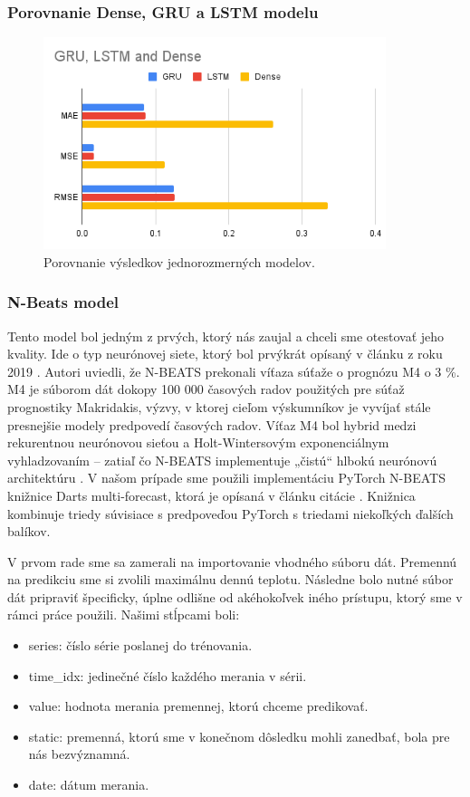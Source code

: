 \subsubsection{Porovnanie Dense, GRU a LSTM modelu}
\begin{figure}[!htbp]
  \centering
  \includegraphics[width=10cm]{img/GRU, LSTM and Dense.png}
  \caption{Porovnanie výsledkov jednorozmerných modelov.}
  \label{univariate}
\end{figure}

\subsubsection{N-Beats model} 
Tento model bol jedným z prvých, ktorý nás zaujal a chceli sme otestovať jeho kvality. Ide o typ neurónovej siete, ktorý bol prvýkrát opísaný v článku z roku 2019 \cite{n-beats}. Autori uviedli, že N-BEATS prekonali víťaza súťaže o prognózu M4 o 3 \%. M4 je súborom dát dokopy 100 000 časových radov použitých pre súťaž prognostiky Makridakis, výzvy, v ktorej cieľom výskumníkov je vyvíjať stále presnejšie modely predpovedí časových radov. Víťaz M4 bol hybrid medzi rekurentnou neurónovou sieťou a Holt-Wintersovým exponenciálnym vyhladzovaním – zatiaľ čo N-BEATS implementuje „čistú“ hlbokú neurónovú architektúru \cite{m4}. V našom prípade sme použili implementáciu PyTorch N-BEATS knižnice Darts multi-forecast, ktorá je opísaná v článku citácie \cite{beat-impl}. Knižnica kombinuje triedy súvisiace s predpoveďou PyTorch s triedami niekoľkých ďalších balíkov. 

V prvom rade sme sa zamerali na importovanie vhodného súboru dát. Premennú na predikciu sme si zvolili maximálnu dennú teplotu. Následne bolo nutné súbor dát pripraviť špecificky, úplne odlišne od akéhokoľvek iného prístupu, ktorý sme v rámci práce použili. Našimi stĺpcami boli:
\begin{itemize}
    \item series: číslo série poslanej do trénovania.
    \item time\_idx: jedinečné číslo každého merania v sérii.
    \item value: hodnota merania premennej, ktorú chceme predikovať.
    \item static: premenná, ktorú sme v konečnom dôsledku mohli zanedbať, bola pre nás bezvýznamná.
    \item date: dátum merania.
\end{itemize}

